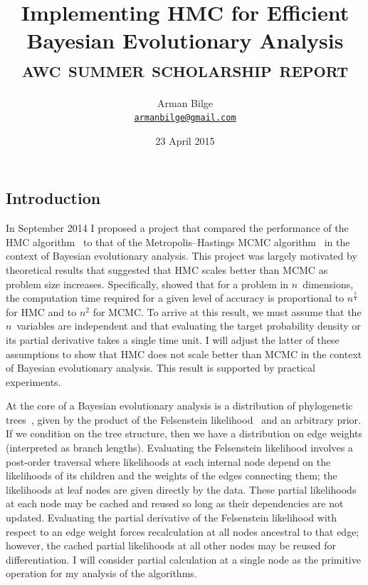 \documentclass{article}
\title{Implementing \acl{HMC} for Efficient Bayesian Evolutionary Analysis \\
           \Large\textsc{awc summer scholarship report}}
\author{Arman Bilge \\ \texttt{\href{mailto:armanbilge@gmail.com}{armanbilge@gmail.com}}}
\date{23 April 2015}
\begin{document}
    \maketitle

    \subsection*{Introduction}
    In September 2014 I proposed a project that compared the performance of the
        \ac{HMC} algorithm~\cite{Dua+87,Nea11} to that of the
        Metropolis--Hastings \ac{MCMC} algorithm~\cite{Met+53,Has70} in the
        context of Bayesian evolutionary analysis.
    This project was largely motivated by theoretical results that suggested
        that \ac{HMC} scales better than \ac{MCMC} as problem size increases.
    Specifically, \textcite{Nea11} showed that for a problem in $n$~dimensions,
        the computation time required for a given level of accuracy is
        proportional to $n^\frac{5}{4}$ for \ac{HMC} and to $n^2$ for
        \ac{MCMC}.
    To arrive at this result, we must assume that the $n$~variables are
        independent and that evaluating the target probability density or its
        partial derivative takes a single time unit.
    I will adjust the latter of these assumptions to show that \ac{HMC} does
        not scale better than \ac{MCMC} in the context of Bayesian evolutionary
        analysis.
    This result is supported by practical experiments.

    At the core of a Bayesian evolutionary analysis is a distribution of
        phylogenetic trees~\cite{Bou+14}, given by the product of the
        Felsenstein likelihood~\cite{Fel81} and an arbitrary prior.
    If we condition on the tree structure, then we have a distribution on edge
        weights (interpreted as branch lengths).
    Evaluating the Felsenstein likelihood involves a post-order traversal where
        likelihoods at each internal node depend on the likelihoods of its
        children and the weights of the edges connecting them; the likelihoods
        at leaf nodes are given directly by the data.
    These partial likelihoods at each node may be cached and reused so long as
        their dependencies are not updated.
    Evaluating the partial derivative of the Felsenstein likelihood with
        respect to an edge weight forces recalculation at all nodes ancestral
        to that edge; however, the cached partial likelihoods at all other
        nodes may be reused for differentiation.
    I will consider partial calculation at a single node as the primitive
        operation for my analysis of the algorithms.
\end{document}
